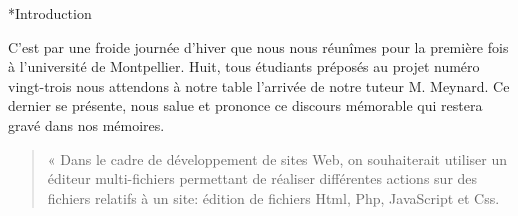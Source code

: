 \documentclass[a4paper, 12pt]{report}
\begin{document}
	\begin{chapter}*{Introduction}


	C'est par une froide journée d'hiver que nous nous réunîmes pour la première fois à l'université de Montpellier. 
	Huit, tous étudiants préposés au projet numéro vingt-trois nous attendons à notre table l'arrivée de notre tuteur M. Meynard. 
	Ce dernier se présente, nous salue et prononce ce discours mémorable qui restera gravé dans nos mémoires.\\
	\begin{quotation}
		« Dans le cadre de développement de sites Web, on souhaiterait utiliser un éditeur multi-fichiers permettant de réaliser 
		différentes actions sur	des fichiers relatifs à un site: édition de fichiers Html, Php, JavaScript et Css.\\


\end{quotation}
\end{chapter}
\end{document}
